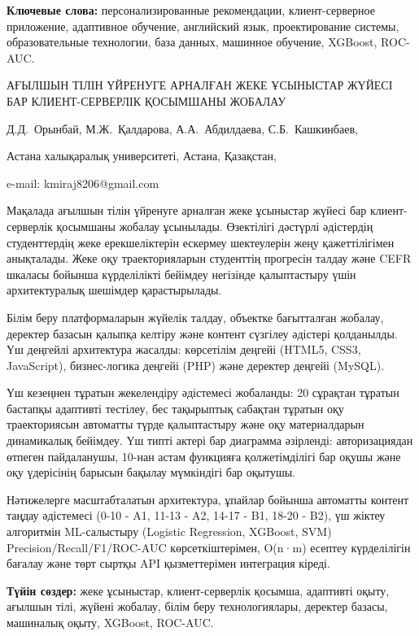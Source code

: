 {\bfseries Ключевые слова:} персонализированные рекомендации,
клиент-серверное приложение, адаптивное обучение, английский язык,
проектирование системы, образовательные технологии, база данных,
машинное обучение, XGBoost, ROC-AUC.

\begin{header}
АҒЫЛШЫН ТІЛІН ҮЙРЕНУГЕ АРНАЛҒАН ЖЕКЕ ҰСЫНЫСТАР ЖҮЙЕСІ БАР КЛИЕНТ-СЕРВЕРЛІК ҚОСЫМШАНЫ ЖОБАЛАУ

Д.Д.~Орынбай,
М.Ж.~Қалдарова\envelope,
А.А.~Абдилдаева,
С.Б.~Кашкинбаев,
\end{header}

\begin{affil}
Астана халықаралық университеті, Астана, Қазақстан,

e-mail: kmiraj8206@gmail.com
\end{affil}

Мақалада ағылшын тілін үйренуге арналған жеке ұсыныстар жүйесі бар
клиент-серверлік қосымшаны жобалау ұсынылады. Өзектілігі дәстүрлі
әдістердің студенттердің жеке ерекшеліктерін ескермеу шектеулерін жеңу
қажеттілігімен анықталады. Жеке оқу траекторияларын студенттің прогресін
талдау және CEFR шкаласы бойынша күрделілікті бейімдеу негізінде
қалыптастыру үшін архитектуралық шешімдер қарастырылады.

Білім беру платформаларын жүйелік талдау, объектке бағытталған жобалау,
деректер базасын қалыпқа келтіру және контент сүзгілеу әдістері
қолданылды. Үш деңгейлі архитектура жасалды: көрсетілім деңгейі (HTML5,
CSS3, JavaScript), бизнес-логика деңгейі (PHP) және деректер деңгейі
(MySQL).

Үш кезеңнен тұратын жекелендіру әдістемесі жобаланды: 20 сұрақтан
тұратын бастапқы адаптивті тестілеу, бес тақырыптық сабақтан тұратын оқу
траекториясын автоматты түрде қалыптастыру және оқу материалдарын
динамикалық бейімдеу. Үш типті актері бар диаграмма әзірленді:
авторизациядан өтпеген пайдаланушы, 10-нан астам функцияға
қолжетімділігі бар оқушы және оқу үдерісінің барысын бақылау мүмкіндігі
бар оқытушы.

Нәтижелерге масштабталатын архитектура, ұпайлар бойынша автоматты
контент таңдау әдістемесі (0-10 - A1, 11-13 - A2, 14-17 - B1, 18-20 -
B2), үш жіктеу алгоритмін ML-салыстыру (Logistic Regression, XGBoost,
SVM) Precision/Recall/F1/ROC-AUC көрсеткіштерімен, O(n·m) есептеу
күрделілігін бағалау және төрт сыртқы API қызметтерімен интеграция
кіреді.

{\bfseries Түйін сөздер:} жеке ұсыныстар, клиент-серверлік қосымша,
адаптивті оқыту, ағылшын тілі, жүйені жобалау, білім беру
технологиялары, деректер базасы, машиналық оқыту, XGBoost, ROC-AUC.

